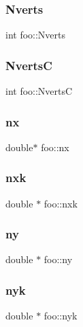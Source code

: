 \subsubsection{\texorpdfstring{Nverts}{Nverts}}
{\footnotesize\ttfamily int foo\+::\+Nverts}

\mbox{\label{structfoo_a8bbef66d4006f49c1ec3f511e4acca0b}} 
\subsubsection{\texorpdfstring{NvertsC}{NvertsC}}
{\footnotesize\ttfamily int foo\+::\+NvertsC}

\mbox{\label{structfoo_a1f135e418c4169bdc92761b5660f9a36}} 
\subsubsection{\texorpdfstring{nx}{nx}}
{\footnotesize\ttfamily double$\ast$ foo\+::nx}

\mbox{\label{structfoo_a24e72f594983ae2d573cf0aec77e92ba}} 
\subsubsection{\texorpdfstring{nxk}{nxk}}
{\footnotesize\ttfamily double $\ast$ foo\+::nxk}

\mbox{\label{structfoo_a168eeff88ff19a8e7ef3ae129bd24ee4}} 
\subsubsection{\texorpdfstring{ny}{ny}}
{\footnotesize\ttfamily double $\ast$ foo\+::ny}

\mbox{\label{structfoo_a1c3fdd99b68a84bc7e269a841951b3f2}} 
\subsubsection{\texorpdfstring{nyk}{nyk}}
{\footnotesize\ttfamily double $\ast$ foo\+::nyk}

